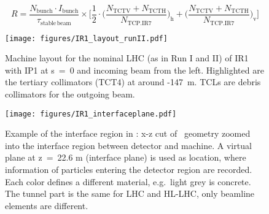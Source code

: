 \begin{equation} \label{eqNormHalo}
R = \frac{N_{\mathrm{bunch}} \cdot I_{\mathrm{bunch}}}{\tau_{\mathrm{stable \, beam}}} \times \Bigg[ \frac{1}{2} \cdot \Big( \frac{N_{\mathrm{TCTV}} + N_{\mathrm{TCTH}}}{N_{\mathrm{TCP.IR7}}}\Big)_{\mathrm{h}} + \Big( \frac{N_{\mathrm{TCTV}} + N_{\mathrm{TCTH}}}{N_{\mathrm{TCP.IR7}}} \Big)_{\mathrm{v}}  \Bigg]
\end{equation}


\begin{figure}%
\begin{center}
\texttt{[image: figures/IR1\_layout\_runII.pdf]}
\end{center}
\vspace{-0.6cm}
 \caption{Machine layout for the nominal LHC (as in Run I and II) of IR1 with IP1 at s~=~0 and incoming beam from the left. Highlighted are the tertiary collimators (TCT4) at around -147~m. TCLs are debris collimators for the outgoing beam.
  \label{nominalLHC_layout}}
\end{figure}




\begin{figure}%
\begin{center}
\texttt{[image: figures/IR1\_interfaceplane.pdf]}
\end{center}
\vspace{-0.6cm}
 \caption{Example of the interface region in \fluka: x-z cut of \fluka~geometry zoomed into the interface region between detector and machine. A virtual plane at z~=~22.6 m (interface plane) is used as location, where information of particles entering the detector region are recorded. Each color defines a different material, e.g.~light grey is concrete. The tunnel part is the same for LHC and HL-LHC, only beamline elements are different.
  \label{flukaGeo_nominal}}
\end{figure}


